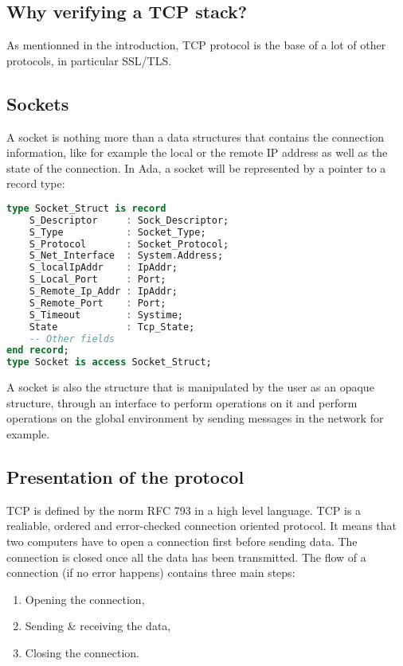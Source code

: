 \documentclass[a4paper, 10pt]{article}
\begin{document}
    \subsection{Why verifying a TCP stack?}

    As mentionned in the introduction, TCP protocol is the base of a lot of other protocols,
    in particular SSL/TLS.


    \subsection{Sockets}

    A socket is nothing more than a data structures that contains the connection
    information, like for example the local or the remote IP address as well as
    the state of the connection. In Ada, a socket will be represented by a pointer
    to a record type:

    \begin{lstlisting}[language=Ada]
type Socket_Struct is record
    S_Descriptor     : Sock_Descriptor;
    S_Type           : Socket_Type;
    S_Protocol       : Socket_Protocol;
    S_Net_Interface  : System.Address;
    S_localIpAddr    : IpAddr;
    S_Local_Port     : Port;
    S_Remote_Ip_Addr : IpAddr;
    S_Remote_Port    : Port;
    S_Timeout        : Systime;
    State            : Tcp_State;
    -- Other fields
end record;
type Socket is access Socket_Struct;
    \end{lstlisting}

    A socket is also the structure that is manipulated by the user as an opaque structure,
    through an interface to perform operations on it and perform operations on the
    global environment by sending messages in the network for example.

    \subsection{Presentation of the protocol}

    TCP is defined by the norm RFC 793 \cite{} in a high level language.
    TCP is a realiable, ordered and error-checked connection oriented protocol.
    It means that two computers have to open a connection first before sending data.
    The connection is closed once all the data has been transmitted.
    The flow of a connection (if no error happens) contains three main steps:
    \begin{enumerate}
        \item Opening the connection,
        \item Sending \& receiving the data,
        \item Closing the connection.
    \end{enumerate}
\end{document}

